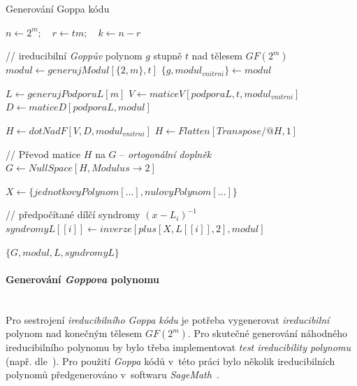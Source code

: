 \documentclass[thesis=M,czech,hidelinks]{FITthesis}[2012/06/26]
\newcommand{\0}{{\textcolor[gray]{0.75}{0}}}
\newenvironment{algoritmus}{
    \floatname{algorithm}{Algoritmus}
    \begin{algorithm}
}{\end{algorithm}}
\begin{document}
\begin{algoritmus}[!ht]
    \caption{Generování Goppa kódu}
    \begin{algorithmic}[1]
        \State $ n \gets 2^m ; \quad r \gets t m ; \quad k \gets n - r $

        // ireducibilní \emph{Goppův} polynom $g$ stupně $t$ nad tělesem $GF(2^m)$
        \State $ modul \gets generujModul[ \{ 2, m \}, t ] $
        \State $ \{ g, modul_{vnitrni} \} \gets modul $

        \hfil
        \State $ L \gets generujPodporuL[ m ] $
        \State $ V \gets maticeV[ podporaL, t, modul_{vnitrni} ] $
        \State $ D \gets maticeD[ podporaL, modul ] $

        \hfil
        \State $ H \gets dotNadF[ V, D, modul_{vnitrni} ] $
        \State $ H \gets Flatten[Transpose \mathbin{/@} H, 1 ] $

        // Převod matice $H$ na $G$ -- \emph{ortogonální doplněk}
        \State $ G \gets NullSpace[ H, Modulus \to 2 ] $

        \hfil
        \State $ X \gets \{ jednotkovyPolynom[\ldots], nulovyPolynom[\ldots] \} $

        // předpočítané dílčí syndromy $\left(x-L_i\right)^{-1}$
            \State $ syndromyL[[i]] \gets inverze[ plus[X, L[[i]], 2], modul ] $
        \EndFor

        \hfil
        \State \Return $ \{ G, modul, L, syndromyL \}$
     \EndFunction
    \end{algorithmic}
\end{algoritmus}


\paragraph{Generování \emph{Goppova} polynomu} \hfil \\
Pro sestrojení \emph{ireducibilního Goppa kódu} je potřeba vygenerovat
\emph{ireducibilní} polynom nad konečným tělesem $GF(2^m)$. Pro skutečné
generování náhodného ireducibilního polynomu by bylo třeba implementovat
\emph{test ireducibility polynomu} (např. dle~\cite{Gao}). Pro použití
\emph{Goppa} kódů v~této práci bylo několik ireducibilních polynomů
předgenerováno v~softwaru \emph{SageMath}~\cite{Sage}.
\end{document}
